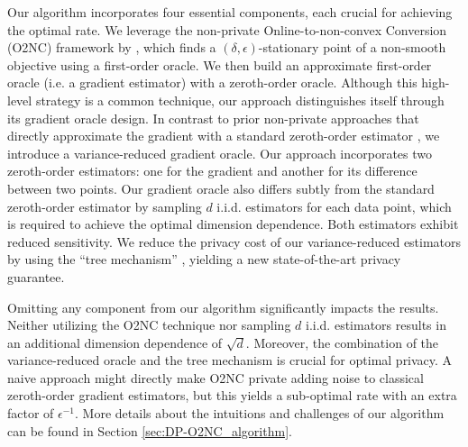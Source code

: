 Our algorithm incorporates four essential components, each crucial for achieving the optimal rate. We leverage the non-private Online-to-non-convex Conversion (O2NC) framework by \cite{cutkosky2023optimal}, which finds a $(\delta,\epsilon)$-stationary point of a non-smooth objective using a first-order oracle. We then build an approximate first-order oracle (i.e. a gradient estimator) with a zeroth-order oracle. Although this high-level strategy is a common technique, our approach distinguishes itself through its gradient oracle design. 
In contrast to prior non-private approaches that directly approximate the gradient with a standard zeroth-order estimator \citep{kornowski2023algorithm}, we introduce a variance-reduced gradient oracle. Our approach incorporates two zeroth-order estimators: one for the gradient and another for its difference between two points. Our gradient oracle also differs subtly from the standard zeroth-order estimator by sampling $d$ i.i.d. estimators for each data point, which is required to achieve the optimal dimension dependence. Both estimators exhibit reduced sensitivity. We reduce the privacy cost of our variance-reduced estimators by using the ``tree mechanism'' \citep{dwork2010differential, chan2011private}, yielding a new state-of-the-art privacy guarantee.

Omitting any component from our algorithm significantly impacts the results. Neither utilizing the O2NC technique nor sampling $d$ i.i.d. estimators results in an additional dimension dependence of $\sqrt{d}$. 
Moreover, the combination of the variance-reduced oracle and the tree mechanism is crucial for optimal privacy. A naive approach might directly make O2NC private adding noise to classical zeroth-order gradient estimators, but this yields a sub-optimal rate with an extra factor of $\epsilon^{-1}$.
More details about the intuitions and challenges of our algorithm can be found in Section \ref{sec:DP-O2NC_algorithm}.